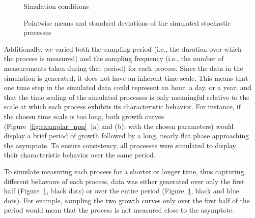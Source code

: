 \documentclass[man, floatsintext]{apa7}
\begin{document}
\begin{figure}[!t]
  \caption{Simulation conditions}
  \label{fig:exemplar_pn}
\end{figure}

\begin{sidewaysfigure*}[htbp]
  \caption{Pointwise means and standard deviations of the simulated stochastic
    processes}
  \label{fig:stoch_mean_var}
\end{sidewaysfigure*}

Additionally, we varied both the sampling period (i.e., the duration over which
the process is measured) and the sampling frequency (i.e., the number of
measurements taken during that period) for each process. Since the data in the
simulation is generated, it does not have an inherent time scale. This means
that one time step in the simulated data could represent an hour, a day, or a
year, and that the time scaling of the simulated processes is only meaningful
relative to the scale at which each process exhibits its characteristic
behavior. For instance, if the chosen time scale is too long, both growth
curves (Figure~\ref{fig:examplar_npn}~(a) and (b); with the chosen parameters)
would display a brief period of growth followed by a long, nearly flat phase
approaching the asymptote. To ensure consistency, all processes were simulated
to display their characteristic behavior over the same period.

To simulate measuring each process for a shorter or longer time, thus capturing
different behaviors of each process, data was either generated over only the
first half (Figure~\ref{fig:exemplar_pn}, black dots) or over the entire period
(Figure~\ref{fig:exemplar_pn}, black and blue dots). For example, sampling the
two growth curves only over the first half of the period would mean that the
process is not measured close to the asymptote.
\end{document}
